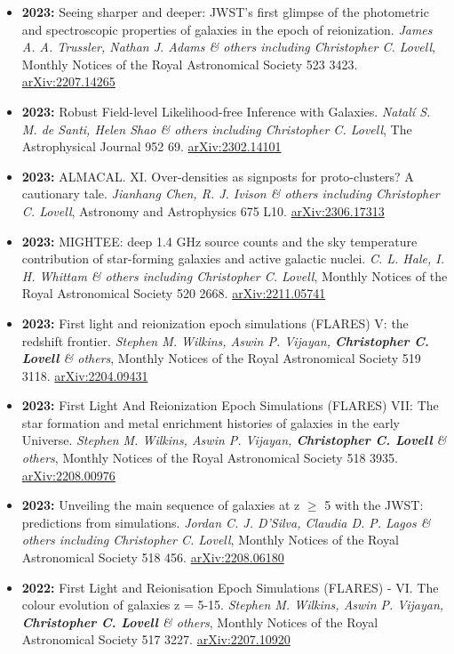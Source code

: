 \begin{itemize}
\item \textbf{2023:} Seeing sharper and deeper: JWST's first glimpse of the photometric and spectroscopic properties of galaxies in the epoch of reionization. \textit{James A. A. Trussler, Nathan J. Adams \& others including Christopher C. Lovell}, Monthly Notices of the Royal Astronomical Society 523 3423. \href{https://arxiv.org/abs/2207.14265}{arXiv:2207.14265}
\item \textbf{2023:} Robust Field-level Likelihood-free Inference with Galaxies. \textit{Natalí S. M. de Santi, Helen Shao \& others including Christopher C. Lovell}, The Astrophysical Journal 952 69. \href{https://arxiv.org/abs/2302.14101}{arXiv:2302.14101}
\item \textbf{2023:} ALMACAL. XI. Over-densities as signposts for proto-clusters? A cautionary tale. \textit{Jianhang Chen, R. J. Ivison \& others including Christopher C. Lovell}, Astronomy and Astrophysics 675 L10. \href{https://arxiv.org/abs/2306.17313}{arXiv:2306.17313}
\item \textbf{2023:} MIGHTEE: deep 1.4 GHz source counts and the sky temperature contribution of star-forming galaxies and active galactic nuclei. \textit{C. L. Hale, I. H. Whittam \& others including Christopher C. Lovell}, Monthly Notices of the Royal Astronomical Society 520 2668. \href{https://arxiv.org/abs/2211.05741}{arXiv:2211.05741}
\item \textbf{2023:} First light and reionization epoch simulations (FLARES) V: the redshift frontier. \textit{Stephen M. Wilkins, Aswin P. Vijayan, \textbf{Christopher C. Lovell} \& others}, Monthly Notices of the Royal Astronomical Society 519 3118. \href{https://arxiv.org/abs/2204.09431}{arXiv:2204.09431}
\item \textbf{2023:} First Light And Reionization Epoch Simulations (FLARES) VII: The star formation and metal enrichment histories of galaxies in the early Universe. \textit{Stephen M. Wilkins, Aswin P. Vijayan, \textbf{Christopher C. Lovell} \& others}, Monthly Notices of the Royal Astronomical Society 518 3935. \href{https://arxiv.org/abs/2208.00976}{arXiv:2208.00976}
\item \textbf{2023:} Unveiling the main sequence of galaxies at z $\geq$ 5 with the JWST: predictions from simulations. \textit{Jordan C. J. D'Silva, Claudia D. P. Lagos \& others including Christopher C. Lovell}, Monthly Notices of the Royal Astronomical Society 518 456. \href{https://arxiv.org/abs/2208.06180}{arXiv:2208.06180}
\item \textbf{2022:} First Light and Reionisation Epoch Simulations (FLARES) - VI. The colour evolution of galaxies z = 5-15. \textit{Stephen M. Wilkins, Aswin P. Vijayan, \textbf{Christopher C. Lovell} \& others}, Monthly Notices of the Royal Astronomical Society 517 3227. \href{https://arxiv.org/abs/2207.10920}{arXiv:2207.10920}

\end{itemize}
